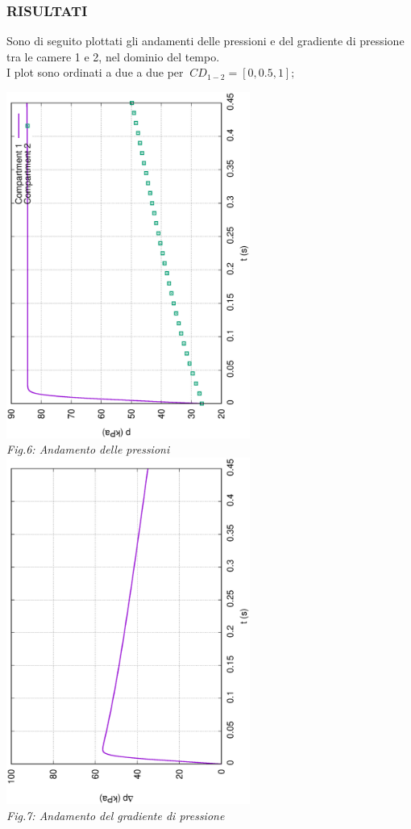 \documentclass{article}
\begin{document}
        \subsubsection{RISULTATI}
        Sono di seguito plottati gli andamenti delle pressioni e del 
        gradiente di pressione tra le camere 1 e 2, nel dominio del tempo. \\ 
        I plot sono ordinati a due a due per $\ CD_{1-2} = [0, 0.5, 1];$ \

        \begin{center}
            \includegraphics[width=0.6\textwidth, angle=-90]{MUL2/p_ES1_0.eps}\\ 
            \textit{Fig.6: Andamento delle pressioni} \\ 
            \label{fig:press_effl_0}
            \includegraphics[width=0.6\textwidth, angle=-90]{MUL2/Dp_ES1_0.eps}\\ 
            \textit{Fig.7: Andamento del gradiente di pressione}\\
        \end{center}
        \pagebreak
        
\end{document}
